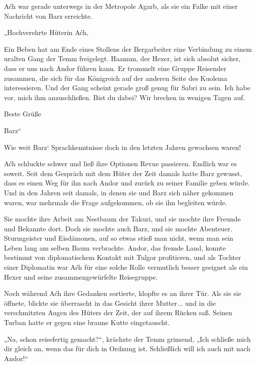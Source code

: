 Aćh war gerade unterwegs in der Metropole Agarb, als sie ein Falke mit einer Nachricht von Barz erreichte.\bigskip



„Hochverehrte Hüterin Aćh,



Ein Beben hat am Ende eines Stollens der Bergarbeiter eine Verbindung zu einem uralten Gang der Temm freigelegt. Haamun, der Hexer, ist sich absolut sicher, dass er uns nach Andor führen kann. Er trommelt eine Gruppe Reisender zusammen, die sich für das Königreich auf der anderen Seite des Kuolema interessieren. Und der Gang scheint gerade groß genug für Sabri zu sein. Ich habe vor, mich ihm anzuschließen. Bist du dabei? Wir brechen in wenigen Tagen auf.



Beste Grüße

Barz“\bigskip



Wie weit Barz‘ Sprachkenntnisse doch in den letzten Jahren gewachsen waren!

Aćh schluckte schwer und ließ ihre Optionen Revue passieren. Endlich war es soweit. Seit dem Gespräch mit dem Hüter der Zeit damals hatte Barz gewusst, dass es einen Weg für ihn nach Andor und zurück zu seiner Familie geben würde. Und in den Jahren seit damals, in denen sie und Barz sich näher gekommen waren, war mehrmals die Frage aufgekommen, ob sie ihn begleiten würde.

Sie mochte ihre Arbeit am Nestbaum der Takuri, und sie mochte ihre Freunde und Bekannte dort. Doch sie mochte auch Barz, und sie mochte Abenteuer. Sturmgeister und Eisdämonen, auf so etwas stieß man nicht, wenn man sein Leben lang am selben Baum verbrachte. Andor, das fremde Land, konnte bestimmt von diplomatischem Kontakt mit Tulgor profitieren, und als Tochter einer Diplomatin war Aćh für eine solche Rolle vermutlich besser geeignet als ein Hexer und seine zusammengewürfelte Reisegruppe.

Noch während Aćh ihre Gedanken sortierte, klopfte es an ihrer Tür. Als sie sie öffnete, blickte sie überrascht in das Gesicht ihrer Mutter... und in die verschmitzten Augen des Hüters der Zeit, der auf ihrem Rücken saß. Seinen Turban hatte er gegen eine braune Kutte eingetauscht.

„Na, schon reisefertig gemacht?“, krächzte der Temm grinsend, „Ich schließe mich dir gleich an, wenn das für dich in Ordnung ist. Schließlich will ich auch mit nach Andor!“\bigskip







